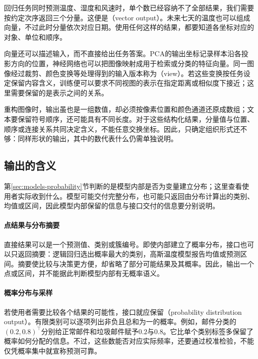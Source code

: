 回归任务同时预测温度、湿度和风速时，单个数已经容纳不了全部结果，我们需要按约定次序返回三个分量。这便是（vector output）。未来七天的温度也可以组成向量，不过此时分量依次对应日期。使用任何这样的结果，都要知道各坐标对应的对象、单位和顺序。

向量还可以描述输入，而不直接给出任务答案。PCA的输出坐标记录样本沿各投影方向的位置，神经网络也可以把图像映射成用于检索或分类的特征向量。同一图像经过裁剪、颜色变换等处理得到的输入版本称为（view）。若这些变换按任务设定保留内容含义，训练便可以要求不同视图的表示在指定距离或相似度下接近；这里需要保留的是表示之间的关系。

重构图像时，输出虽也是一组数值，却必须按像素位置和颜色通道还原成数组；文本要保留符号顺序，还可能具有不同长度。对于这些结构化结果，分量值与位置、顺序或连接关系共同决定含义，不能任意交换坐标。因此，只确定组织形式还不够：同样形状的输出，其中的数代表什么仍需单独说明。

\subsection{输出的含义}
\label{sec:models-output-semantics}

第\ref{sec:models-probability}节判断的是模型内部是否为变量建立分布；这里查看使用者实际收到什么。模型可能交付完整分布，也可能只返回由分布计算出的类别、均值或区间，因此模型内部保留的信息与接口交付的信息要分别说明。

\paragraph{点结果与分布摘要}

直接结果可以是一个预测值、类别或簇编号。即使内部建立了概率分布，接口也可以只返回摘要：逻辑回归选出概率最大的类别，高斯温度模型报告均值或预测区间。摘要使比较与决策更方便，却省略了部分可能结果及其概率。因此，输出一个点或区间，并不能据此判断模型内部有无概率语义。

\paragraph{概率分布与采样}
\label{sec:models-distribution-output}

若使用者需要比较各个结果的可能性，接口就应保留（probability distribution output）。有限类别可以逐项列出非负且总和为一的概率。例如，邮件分类的$(0.2,0.8)^{\top}$分别给正常邮件和垃圾邮件赋予$0.2$与$0.8$。它比单个类别标签多保留了概率如何分配的信息。不过，这些数能否对应实际频率，还要通过校准检验，不能仅凭概率集中就宣称预测可靠。

